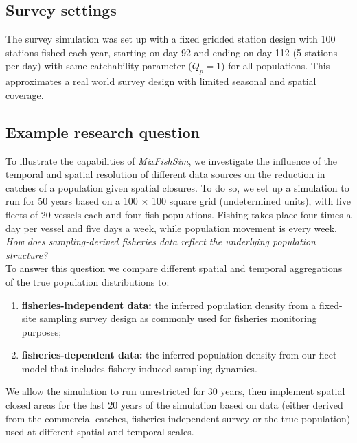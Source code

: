 \documentclass[review]{elsarticle}
\begin{document}
\subsection{Survey settings}

The survey simulation was set up with a fixed gridded station design with 100
stations fished each year, starting on day 92 and ending on day 112 (5 stations
per day) with same catchability parameter ($Q_{p} = 1$) for all populations.
This approximates a real world survey design with limited seasonal and spatial
coverage. 

\subsection{Example research question}

To illustrate the capabilities of \textit{MixFishSim}, we investigate the
influence of the temporal and spatial resolution of different data sources on
the reduction in catches of a population given spatial closures. To do so, we
set up a simulation to run for 50 years based on a 100 $\times$ 100 square grid
(undetermined units), with five fleets of 20 vessels each and four fish
populations. Fishing takes place four times a day per vessel and five days a
week, while population movement is every week. \\

\textit{How does sampling-derived fisheries data reflect the underlying
	population structure?} \\

To answer this question we compare different spatial and temporal aggregations
of the true population distributions to:
\begin{enumerate}[label=\alph*)]
	\item \textbf{fisheries-independent data:} the inferred population
		density from a fixed-site sampling survey design as commonly
		used for
		fisheries monitoring purposes;
	\item \textbf{fisheries-dependent data:} the inferred population
		density from our fleet model that includes fishery-induced
		sampling dynamics.
\end{enumerate}

We allow the simulation to run unrestricted for 30 years, then implement
spatial closed areas for the last 20 years of the simulation based on data
(either derived from the commercial catches, fisheries-independent survey or
the true population) used at different spatial and temporal scales. \\
\end{document}
